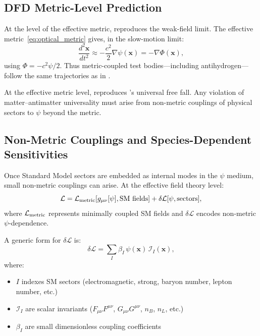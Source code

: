 \subsection{DFD Metric-Level Prediction}\label{sec:antimatter-dfd-metric}

At the level of the effective metric, \DFD reproduces the \GR weak-field 
limit. The effective metric~\eqref{eq:optical_metric} gives, in the slow-motion limit:
\begin{equation}
\frac{d^2\mathbf{x}}{dt^2} \approx -\frac{c^2}{2}\nabla\psi(\mathbf{x}) = -\nabla\Phi(\mathbf{x}),
\end{equation}
using $\Phi = -c^2\psi/2$. Thus metric-coupled test bodies---including 
antihydrogen---follow the same trajectories as in \GR.

\begin{remark}
At the effective metric level, \DFD reproduces \GR's universal free fall. 
Any violation of matter--antimatter universality must arise from non-metric 
couplings of physical sectors to $\psi$ beyond the metric.
\end{remark}

\subsection{Non-Metric Couplings and Species-Dependent Sensitivities}\label{sec:antimatter-sigma}

Once Standard Model sectors are embedded as internal modes in the $\psi$ 
medium, small non-metric couplings can arise. At the effective field theory 
level:
\begin{equation}
\mathcal{L} = \mathcal{L}_{\rm metric}[g_{\mu\nu}[\psi], \text{SM fields}] 
+ \delta\mathcal{L}[\psi, \text{sectors}],
\label{eq:lagrangian-split}
\end{equation}
where $\mathcal{L}_{\rm metric}$ represents minimally coupled SM fields and 
$\delta\mathcal{L}$ encodes non-metric $\psi$-dependence.

A generic form for $\delta\mathcal{L}$ is:
\begin{equation}
\delta\mathcal{L} = \sum_I \beta_I\,\psi(\mathbf{x})\,\mathcal{I}_I(\mathbf{x}),
\label{eq:non-metric-coupling}
\end{equation}
where:
\begin{itemize}
\item $I$ indexes SM sectors (electromagnetic, strong, baryon number, lepton number, etc.)
\item $\mathcal{I}_I$ are scalar invariants ($F_{\mu\nu}F^{\mu\nu}$, $G_{\mu\nu}G^{\mu\nu}$, $n_B$, $n_L$, etc.)
\item $\beta_I$ are small dimensionless coupling coefficients
\end{itemize}

